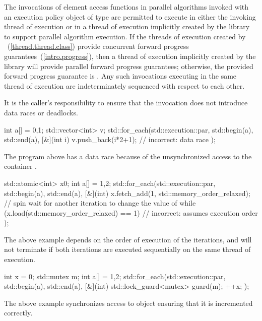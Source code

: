 \pnum
The invocations of element access functions in parallel algorithms invoked with
an execution policy object of type  are
permitted to execute in either the invoking thread of execution or in a
thread of execution implicitly
created by the library to support parallel algorithm execution.
If the threads of execution created by ~(\ref{thread.thread.class}) provide concurrent
forward progress guarantees~(\ref{intro.progress}), then a thread of execution
implicitly created by the library will provide parallel forward progress guarantees;
otherwise, the provided forward progress guarantee is
.
Any such
invocations executing in the same thread of execution are indeterminately sequenced with
respect to each other.
\begin{note}
It is the caller's responsibility to ensure that the
invocation does not introduce data races or deadlocks.
\end{note}
\begin{example}
\begin{codeblock}
int a[] = {0,1};
std::vector<int> v;
std::for_each(std::execution::par, std::begin(a), std::end(a), [&](int i) {
  v.push_back(i*2+1); // incorrect: data race
});
\end{codeblock}
The program above has a data race because of the unsynchronized access to the
container .
\end{example}
\begin{example}
\begin{codeblock}
std::atomic<int> x{0};
int a[] = {1,2};
std::for_each(std::execution::par, std::begin(a), std::end(a), [&](int) {
  x.fetch_add(1, std::memory_order_relaxed);
  // spin wait for another iteration to change the value of 
  while (x.load(std::memory_order_relaxed) == 1) { } // incorrect: assumes execution order
});
\end{codeblock}
The above example depends on the order of execution of the iterations, and
will not terminate if both iterations are executed sequentially on the same
thread of execution.
\end{example}
\begin{example}
\begin{codeblock}
int x = 0;
std::mutex m;
int a[] = {1,2};
std::for_each(std::execution::par, std::begin(a), std::end(a), [&](int) {
  std::lock_guard<mutex> guard(m);
  ++x;
});
\end{codeblock}
The above example synchronizes access to object  ensuring that it is
incremented correctly.
\end{example}

